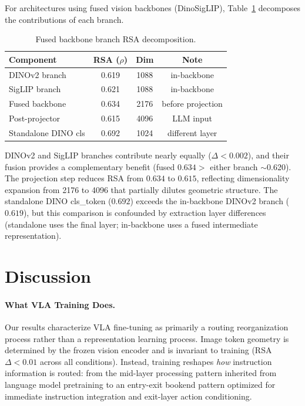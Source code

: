 \documentclass[10pt,letterpaper]{article}
\begin{document}
For architectures using fused vision backbones (DinoSigLIP), Table~\ref{tab:branch_split} decomposes the contributions of each branch.

\begin{table}[h]
\centering
\caption{Fused backbone branch RSA decomposition.}
\label{tab:branch_split}
\begin{tabular}{lccc}
\toprule
Component & RSA ($\rho$) & Dim & Note \\
\midrule
DINOv2 branch & 0.619 & 1088 & in-backbone \\
SigLIP branch & 0.621 & 1088 & in-backbone \\
Fused backbone & 0.634 & 2176 & before projection \\
Post-projector & 0.615 & 4096 & LLM input \\
Standalone DINO cls & 0.692 & 1024 & different layer \\
\bottomrule
\end{tabular}
\end{table}

DINOv2 and SigLIP branches contribute nearly equally ($\Delta < 0.002$), and their fusion provides a complementary benefit (fused $0.634 >$ either branch $\sim$0.620). The projection step reduces RSA from $0.634$ to $0.615$, reflecting dimensionality expansion from 2176 to 4096 that partially dilutes geometric structure. The standalone DINO cls\_token ($0.692$) exceeds the in-backbone DINOv2 branch ($0.619$), but this comparison is confounded by extraction layer differences (standalone uses the final layer; in-backbone uses a fused intermediate representation).

\section{Discussion}
\label{sec:discussion}

\paragraph{What VLA Training Does.}
Our results characterize VLA fine-tuning as primarily a routing reorganization process rather than a representation learning process. Image token geometry is determined by the frozen vision encoder and is invariant to training (RSA $\Delta < 0.01$ across all conditions). Instead, training reshapes \emph{how} instruction information is routed: from the mid-layer processing pattern inherited from language model pretraining to an entry-exit bookend pattern optimized for immediate instruction integration and exit-layer action conditioning.
\end{document}
